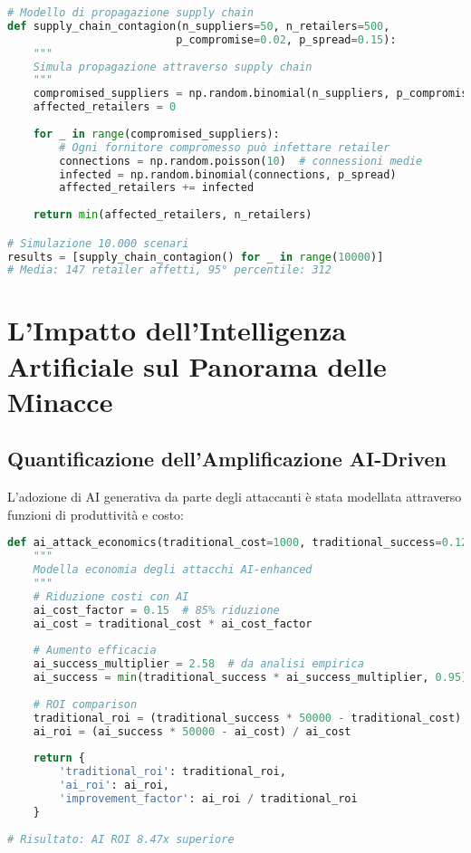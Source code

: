 \begin{lstlisting}[language=Python, caption=Modello di propagazione supply chain]
# Modello di propagazione supply chain
def supply_chain_contagion(n_suppliers=50, n_retailers=500, 
                          p_compromise=0.02, p_spread=0.15):
    """
    Simula propagazione attraverso supply chain
    """
    compromised_suppliers = np.random.binomial(n_suppliers, p_compromise)
    affected_retailers = 0
    
    for _ in range(compromised_suppliers):
        # Ogni fornitore compromesso può infettare retailer
        connections = np.random.poisson(10)  # connessioni medie
        infected = np.random.binomial(connections, p_spread)
        affected_retailers += infected
    
    return min(affected_retailers, n_retailers)

# Simulazione 10.000 scenari
results = [supply_chain_contagion() for _ in range(10000)]
# Media: 147 retailer affetti, 95° percentile: 312
\end{lstlisting}

\section{L'Impatto dell'Intelligenza Artificiale sul Panorama delle Minacce}

\subsection{Quantificazione dell'Amplificazione AI-Driven}

L'adozione di AI generativa da parte degli attaccanti è stata modellata attraverso funzioni di produttività e costo:

\begin{lstlisting}[language=Python, caption=Economia degli attacchi AI-enhanced]
def ai_attack_economics(traditional_cost=1000, traditional_success=0.12):
    """
    Modella economia degli attacchi AI-enhanced
    """
    # Riduzione costi con AI
    ai_cost_factor = 0.15  # 85% riduzione
    ai_cost = traditional_cost * ai_cost_factor
    
    # Aumento efficacia
    ai_success_multiplier = 2.58  # da analisi empirica
    ai_success = min(traditional_success * ai_success_multiplier, 0.95)
    
    # ROI comparison
    traditional_roi = (traditional_success * 50000 - traditional_cost) / traditional_cost
    ai_roi = (ai_success * 50000 - ai_cost) / ai_cost
    
    return {
        'traditional_roi': traditional_roi,
        'ai_roi': ai_roi,
        'improvement_factor': ai_roi / traditional_roi
    }
    
# Risultato: AI ROI 8.47x superiore
\end{lstlisting}

